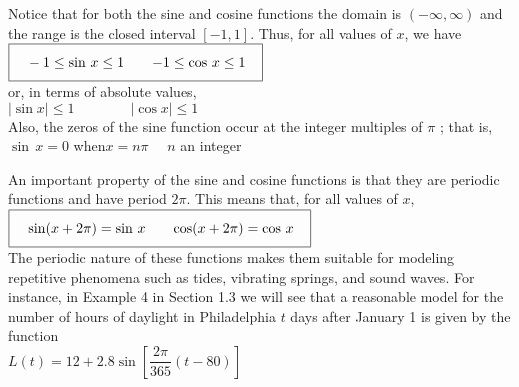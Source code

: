 \documentclass{sebase}
\begin{document}
Notice that for both the sine and cosine functions the domain is $(-\infty
,\infty )$ and the range is the closed interval $[-1,1]$. Thus, for all
values of $x$, we have\\[9pt]
\hspace*{\fill}$\fbox{$\hspace{9pt}\rule[-7pt]{0pt}{20pt}-1\leq \sin \,x\leq
1$\qquad $-1\leq \cos \,x\leq 1\hspace{9pt}$}$\hspace*{\fill}\\[9pt]
or, in terms of absolute values,\\[6pt]
\hspace*{\fill}$\left\vert \sin x\right\vert \leq 1\qquad \qquad \left\vert
\cos x\right\vert \leq 1$\hspace*{\fill}\\[6pt]
Also, the zeros of the sine function occur at the integer multiples of $\pi $%
; that is,\\[6pt]
\hspace*{\fill}$\sin \,x=0$ \qquad when\qquad $x=n\pi \quad $ $n$ an integer%
\hspace*{\fill}\vspace*{6pt}

An important property of the sine and cosine functions is that they are
periodic functions and have period $2\pi $. This means that, for all values
of $x$,\\[9pt]
\hspace*{\fill}$\fbox{$\hspace{9pt}\rule[-7pt]{0pt}{20pt}\sin (x+2\pi )=\sin
\,x$\qquad $\cos (x+2\pi )=\cos \,x\hspace{9pt}$}$\hspace*{\fill}\\[9pt]
The periodic nature of these functions makes them suitable for modeling
repetitive phenomena such as tides, vibrating springs, and sound waves. For
instance, in Example 4 in Section 1.3 we will see that a reasonable model
for the number of hours of daylight in Philadelphia $t$ days after January 1
is given by the function\\[6pt]
\hspace*{\fill}$L(t)=12+2.8\sin \left[ \dfrac{2\pi }{365}(t-80)\right] $%
\hspace*{\fill}\vspace*{6pt}
\end{document}
